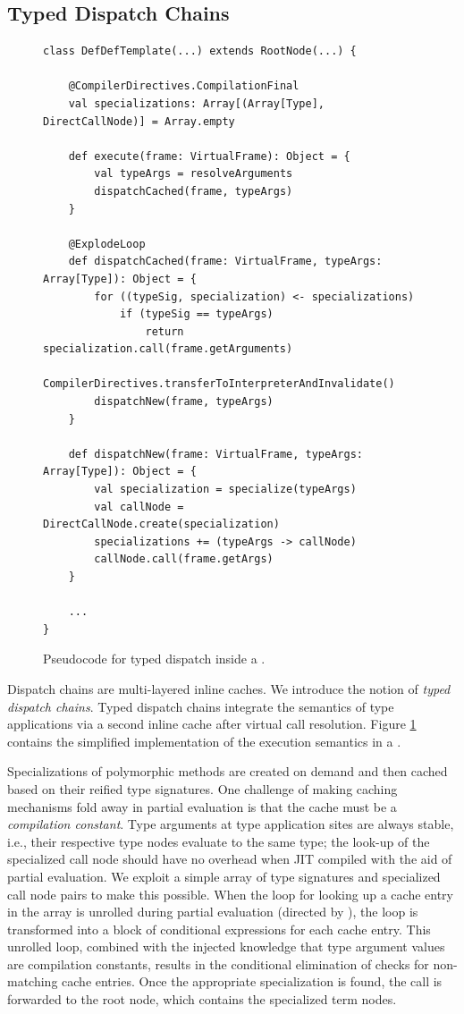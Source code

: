 \newpage
\subsection{Typed Dispatch Chains}

\begin{figure}[!htb]
\begin{verbatim}
class DefDefTemplate(...) extends RootNode(...) { 
		
	@CompilerDirectives.CompilationFinal
	val specializations: Array[(Array[Type], DirectCallNode)] = Array.empty
		
	def execute(frame: VirtualFrame): Object = {
		val typeArgs = resolveArguments
		dispatchCached(frame, typeArgs)
	}
		
	@ExplodeLoop
	def dispatchCached(frame: VirtualFrame, typeArgs: Array[Type]): Object = {
		for ((typeSig, specialization) <- specializations)
			if (typeSig == typeArgs)
				return specialization.call(frame.getArguments)
		CompilerDirectives.transferToInterpreterAndInvalidate()
		dispatchNew(frame, typeArgs)
	}
	
	def dispatchNew(frame: VirtualFrame, typeArgs: Array[Type]): Object = {
		val specialization = specialize(typeArgs)
		val callNode = DirectCallNode.create(specialization)
		specializations += (typeArgs -> callNode)
		callNode.call(frame.getArgs)
	}
	
	...
}
\end{verbatim}
\caption{Pseudocode for typed dispatch inside a .}
\label{impl:defdeftemplate-execute}
\end{figure}

Dispatch chains\cite{trufflyruby:specialization} are multi-layered inline caches.
We introduce the notion of \textit{typed dispatch chains}.
Typed dispatch chains integrate the semantics of type applications via a second inline cache after virtual call resolution.
Figure \ref{impl:defdeftemplate-execute} contains the simplified implementation of the execution semantics in a .

Specializations of polymorphic methods are created on demand and then cached based on their reified type signatures.
One challenge of making caching mechanisms fold away in partial evaluation is that the cache must be a \textit{compilation constant}.
Type arguments at type application sites are always stable, i.e., their respective type nodes evaluate to the same type; the look-up of the specialized call node should have no overhead when JIT compiled with the aid of partial evaluation. 
We exploit a simple array of type signatures and specialized call node pairs to make this possible.
When the loop for looking up a cache entry in the array is unrolled during partial evaluation (directed by ), the loop is transformed into a block of conditional expressions for each cache entry.
This unrolled loop, combined with the injected knowledge that type argument values are compilation constants, results in the conditional elimination\cite{conditional-elim} of checks for non-matching cache entries.
Once the appropriate specialization is found, the call is forwarded to the root node, which contains the specialized term nodes.

